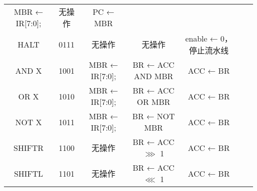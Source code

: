 \documentclass[lang=cn,a4paper,newtx]{elegantpaper}
\begin{document}
\begin{longtable}{ccccccl}
  MBR ← IR[7:0]; &
  无操作 & 
  PC ← MBR \\

  HALT & 0111 &
  
  无操作 &
  无操作 & 
  enable ← 0，停止流水线 \\

  
  \midrule
  AND X & 1001 &
  
  MBR ← IR[7:0]; &
  BR ← ACC AND MBR &
  ACC ← BR \\

  OR X & 1010 &
  
  MBR ← IR[7:0];  &
  BR ← ACC OR MBR &
  ACC ← BR \\

  NOT X & 1011 &
  
  MBR ← IR[7:0];&
  BR ← NOT MBR &
  ACC ← BR \\

  SHIFTR & 1100 &
  
  无操作 &
  BR ← ACC $\ggg $ 1 &
  ACC ← BR \\

  SHIFTL & 1101 &
  
  无操作 &
  BR ← ACC $\lll$ 1 &
  ACC ← BR \\

\end{longtable}
\end{document}
